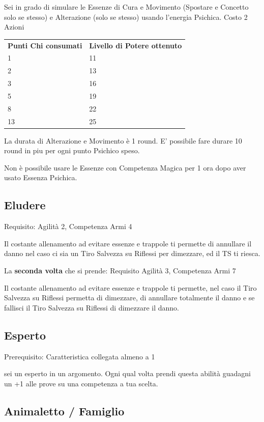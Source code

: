 \documentclass[a4paper,11pt,twoside,openany]{book}
\begin{document}
Sei in grado di simulare le Essenze di Cura e Movimento (Spostare e Concetto solo se stesso) e Alterazione (solo se stesso) usando l'energia Psichica. Costo 2 Azioni

\bigskip

\begin{tabular}{ll}
	\toprule
	\textbf{Punti Chi consumati} & \textbf{Livello di Potere ottenuto}\tabularnewline
	1                            & 11\tabularnewline
	2                            & 13\tabularnewline
	3                            & 16\tabularnewline
	5                            & 19\tabularnewline
	8                            & 22\tabularnewline
	13                           & 25\tabularnewline
\end{tabular}

\bigskip

La durata di Alterazione e Movimento è 1 round. E' possibile fare durare 10 round in piu per ogni punto Psichico speso.

Non è possibile usare le Essenze con Competenza Magica per 1 ora dopo aver usato Essenza Psichica.

\subsection{Eludere}

Requisito: Agilità 2, Competenza Armi 4

Il costante allenamento ad evitare essenze e trappole ti permette di annullare il danno nel caso ci sia un Tiro Salvezza su Riflessi per dimezzare, ed il TS ti riesca.


La \textbf{seconda volta} che si prende: Requisito Agilità 3, Competenza Armi 7

Il costante allenamento ad evitare essenze e trappole ti permette, nel caso il Tiro Salvezza su Riflessi permetta di dimezzare, di annullare totalmente il danno e se fallisci il Tiro Salvezza su Riflessi di dimezzare il danno.

\subsection{Esperto}

Prerequisito: Caratteristica collegata almeno a 1

sei un esperto in un argomento. Ogni qual volta prendi questa abilità guadagni un +1 alle prove su una competenza a tua scelta.

\subsection{Animaletto / Famiglio}
\end{document}
